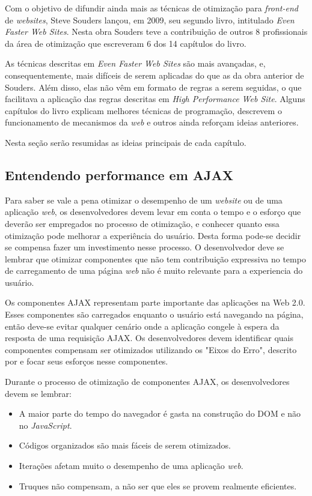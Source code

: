 Com o objetivo de difundir ainda mais as técnicas de otimização para \textit{front-end} de \textit{websites}, Steve Souders lançou, em 2009, seu segundo livro, intitulado \textit{Even Faster Web Sites}. Nesta obra Souders teve a contribuição de outros 8 profissionais da área de otimização que escreveram 6 dos 14 capítulos do livro.

As técnicas descritas em \textit{Even Faster Web Sites} são mais avançadas, e, consequentemente, mais difíceis de serem aplicadas do que as da obra anterior de Souders. Além disso, elas não vêm em formato de regras a serem seguidas, o que facilitava a aplicação das regras descritas em \textit{High Performance Web Site}. Alguns capítulos do livro explicam melhores técnicas de programação, descrevem o funcionamento de mecanismos da \textit{web} e outros ainda reforçam ideias anteriores.

Nesta seção serão resumidas as ideias principais de cada capítulo.

\subsection{Entendendo performance em AJAX}
\label{subsec:evenfaster_cap1}
Para saber se vale a pena otimizar o desempenho de um \textit{website} ou de uma aplicação \textit{web}, os desenvolvedores devem levar em conta o tempo e o esforço que deverão ser empregados no processo de otimização, e conhecer quanto essa otimização pode melhorar a experiência do usuário. Desta forma pode-se decidir se compensa fazer um investimento nesse processo. O desenvolvedor deve se lembrar que otimizar componentes que não tem contribuição expressiva no tempo de carregamento de uma página \textit{web} não é muito relevante para a experiencia do usuário.

Os componentes AJAX representam parte importante das aplicações na Web 2.0. Esses componentes são carregados enquanto o usuário está navegando na página, então deve-se evitar qualquer cenário onde a aplicação congele à espera da resposta de uma requisição AJAX. Os desenvolvedores devem identificar quais componentes compensam ser otimizados utilizando os "Eixos do Erro", descrito por  e focar seus esforços nesse componentes.

Durante o processo de otimização de componentes AJAX, os desenvolvedores devem se lembrar:
\begin{itemize}
	\item A maior parte do tempo do navegador é gasta na construção do DOM e não no \textit{JavaScript}.
	\item Códigos organizados são mais fáceis de serem otimizados.
	\item Iterações afetam muito o desempenho de uma aplicação \textit{web}.
	\item Truques não compensam, a não ser que eles se provem realmente eficientes.
\end{itemize}

